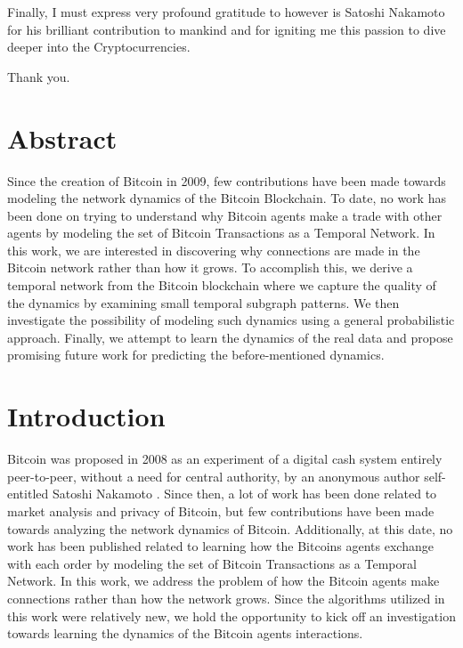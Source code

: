 \documentclass[12pt, %
abstract=on %
]{scrreprt} %
\theoremstyle{definition}
\theoremstyle{remark}
\begin{document}
    Finally, I must express very profound gratitude to however is Satoshi Nakamoto for his brilliant contribution to mankind and for igniting me this passion to dive deeper into the Cryptocurrencies.
    
     Thank you.



    \chapter*{Abstract}
    
Since the creation of Bitcoin in 2009, few contributions have been made towards modeling the network dynamics of the Bitcoin Blockchain. To date, no work has been done on trying to understand why Bitcoin agents make a trade with other agents by modeling the set of Bitcoin Transactions as a Temporal Network. In this work, we are interested in discovering why connections are made in the Bitcoin network rather than how it grows. To accomplish this, we derive a temporal network from the Bitcoin blockchain where we capture the quality of the dynamics by examining small temporal subgraph patterns. We then investigate the possibility of modeling such dynamics using a general probabilistic approach. Finally, we attempt to learn the dynamics of the real data and propose promising future work for predicting the before-mentioned dynamics. 

    
    
    \chapter*{Introduction}
    
Bitcoin was proposed in 2008 as an experiment of a digital cash system entirely peer-to-peer, without a need for central authority, by an anonymous author self-entitled Satoshi Nakamoto \cite{nakamoto2008bitcoin}.  Since then, a lot of work has been done related to market analysis and privacy of Bitcoin, but few contributions have been made towards analyzing the network dynamics of Bitcoin. Additionally, at this date, no work has been published related to learning how the Bitcoins agents exchange with each order by modeling the set of Bitcoin Transactions as a Temporal Network. In this work, we address the problem of how the Bitcoin agents make connections rather than how the network grows. Since the algorithms utilized in this work were relatively new, we hold the opportunity to kick off an investigation towards learning the dynamics of the Bitcoin agents interactions. 
\end{document}

